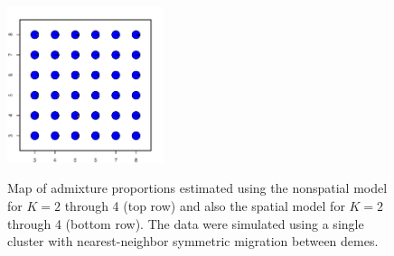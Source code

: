 \documentclass[12pt]{article}
\begin{document}
\begin{figure}
			{\includegraphics[width=1.8in,height=1.8in]{figs/sims/simK1_sp_pies_K7.pdf}}
	\caption{
	Map of admixture proportions estimated using the nonspatial model for $K=2$ through 4 (top row)
	and also the spatial model for $K=2$ through 4 (bottom row).
	The data were simulated using a single cluster with nearest-neighbor symmetric migration between demes.
    }\label{simK1_pies}
\end{figure}
\end{document}

